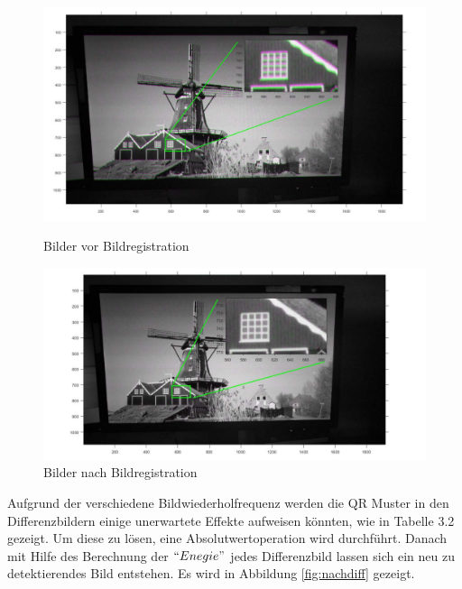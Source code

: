 \begin{figure}[H]
\centering 
\begin{minipage}[b]{0.49\textwidth} 
\centering 
\includegraphics[width=1.0\textwidth]{images/5_Implementirung/vorregistration.pdf} 
\caption{Bilder vor Bildregistration}
\label{fig:vorregistration}
\end{minipage}
\begin{minipage}[b]{0.49\textwidth} 
\centering 
\includegraphics[width=1.1\textwidth]{images/5_Implementirung/nachregis.pdf}
\caption{Bilder nach Bildregistration}
\label{fig:nachregis}
\end{minipage}
\end{figure}
 
Aufgrund der verschiedene Bildwiederholfrequenz werden die QR Muster in den Differenzbildern einige unerwartete Effekte aufweisen könnten, wie in Tabelle 3.2 gezeigt. Um diese zu lösen, eine Absolutwertoperation wird durchführt. Danach mit Hilfe des Berechnung der $ ``Enegie" $ jedes Differenzbild lassen sich ein neu zu detektierendes Bild entstehen. Es wird in Abbildung \ref{fig:nachdiff} gezeigt.

